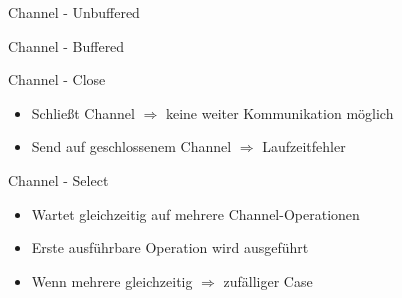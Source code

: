 \documentclass[aspectratio=169]{beamer}  %
\begin{document}

\begin{frame}{Channel - Unbuffered}
  \begin{minipage}{0.49\textwidth}
    
  \end{minipage}
  \hfill
  \hfill
  \begin{minipage}{0.49\textwidth}
  \end{minipage}
\end{frame}

\begin{frame}{Channel - Buffered}
  \begin{minipage}{0.49\textwidth}
    
  \end{minipage}
  \hfill
  \hfill
  \begin{minipage}{0.49\textwidth}
  \end{minipage}
\end{frame}

\begin{frame}{Channel - Close}
  \begin{minipage}{0.49\textwidth}
    \begin{itemize}
      \item Schließt Channel $\Rightarrow$ keine weiter Kommunikation möglich
      \item Send auf geschlossenem Channel $\Rightarrow$ Laufzeitfehler
    \end{itemize}
  \end{minipage}
  \hfill
  \vrule{}
  \hfill
  \begin{minipage}{0.49\textwidth}
    
  \end{minipage}
\end{frame}

\begin{frame}{Channel - Select}
  \begin{minipage}{0.49\textwidth}
    \begin{itemize}
      \item Wartet gleichzeitig auf mehrere Channel-Operationen
      \item Erste ausführbare Operation wird ausgeführt
      \item Wenn mehrere gleichzeitig $\Rightarrow$ zufälliger Case
    \end{itemize}
  \end{minipage}
  \hfill
  \vrule{}
  \hfill
  \begin{minipage}{0.49\textwidth}
    
  \end{minipage}
\end{frame}
\end{document}

